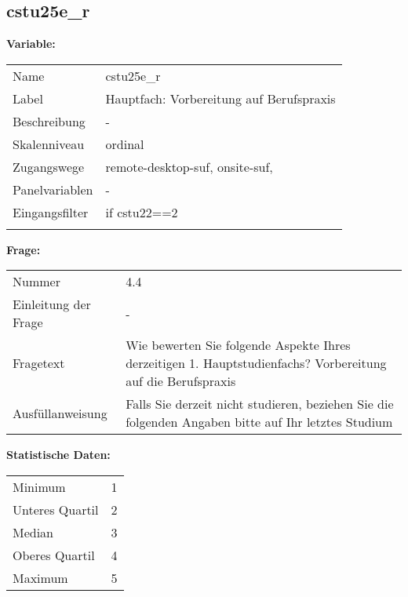 	
	
	\subsection{cstu25e\_r}
	\label{subSection:cstu25e_r}

	\noindent\textbf{Variable:}\\
		\begin{tabular}{lL{11.3cm}}
			\label{tableVariable:cstu25e_r}
			Name & cstu25e\_r \\
			Label & Hauptfach: Vorbereitung auf Berufspraxis \\
			Beschreibung & - \\
			Skalenniveau & ordinal \\
			Zugangswege &
				remote-desktop-suf,
				onsite-suf,
 \\
			Panelvariablen & -
			 \\
			Eingangsfilter & if cstu22==2 \\
 \\
		\end{tabular}

		\vspace*{1 cm}
		\noindent\textbf{Frage:}\\
		\begin{tabular}{lL{11.3cm}}
			\label{tableQuestion:cstu25e_r}
			Nummer & 4.4 \\
			Einleitung der Frage & - \\
			Fragetext & Wie bewerten Sie folgende Aspekte Ihres derzeitigen 1. Hauptstudienfachs?
Vorbereitung auf die Berufspraxis \\
			Ausfüllanweisung & Falls Sie derzeit nicht studieren, beziehen Sie die folgenden Angaben bitte auf Ihr letztes Studium \\
		\end{tabular}


		\vspace*{1 cm}
		\noindent\textbf{Statistische Daten:}\\
			\begin{tabular}{ll}
				\label{tableStatistics:cstu25e_r}
					Minimum & 1 \\
					Unteres Quartil & 2 \\
					Median & 3 \\
					Oberes Quartil & 4 \\
					Maximum & 5 \\
			\end{tabular}



